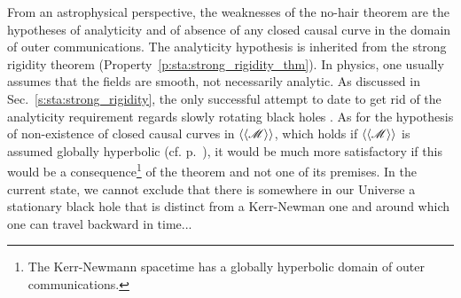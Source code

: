 From an astrophysical perspective, the weaknesses of the no-hair theorem are
the hypotheses of analyticity and of absence of any closed causal curve
in the domain of outer communications. The analyticity hypothesis is
inherited from the strong rigidity theorem (Property~\ref{p:sta:strong_rigidity_thm}).
In physics, one usually assumes that the fields are smooth, not necessarily
analytic. As discussed in Sec.~\ref{s:sta:strong_rigidity}, the only successful
attempt to date to get rid of the analyticity requirement regards slowly rotating
black holes \cite{AlexaIK14}. As for the hypothesis of non-existence of closed
causal curves in $\langle\langle \mathscr{M}\rangle\rangle$, which holds if
$\langle\langle \mathscr{M}\rangle\rangle$
is assumed globally hyperbolic (cf. p.~\pageref{d:sta:glob_hyperbol}),
it would be much more satisfactory if this would be a consequence\footnote{The Kerr-Newmann spacetime has a globally hyperbolic domain of outer
communications.} of the theorem and not one of its premises.
In the current state, we cannot exclude that there is somewhere in our Universe
a stationary black hole that is distinct from a Kerr-Newman one and around
which one can travel backward in time...

